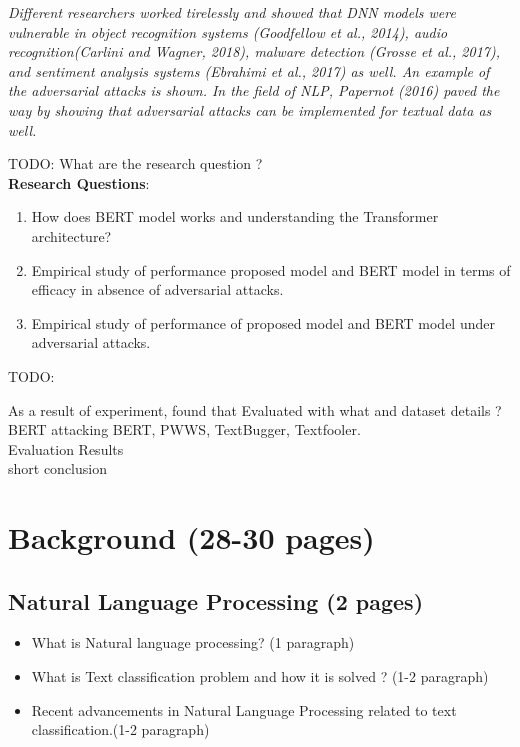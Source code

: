 \documentclass[%
	BCOR=8mm, %
	DIV=12, 
	toc=bibliography, %
	toc=listof, %
	oneside, %
	egregdoesnotlikesansseriftitles, %
	]{scrbook}
\begin{document}
\textit{ Different researchers worked tirelessly and showed that DNN models were vulnerable in object recognition systems (Goodfellow et al., 2014), audio recognition(Carlini and Wagner, 2018),
 malware detection (Grosse et al., 2017), and sentiment analysis systems (Ebrahimi et al., 2017) as well. An example of the adversarial attacks is shown.\cite{huq_adversarial_2020}
In the field of NLP, Papernot (2016) paved the way by showing that adversarial attacks can be implemented for textual data as well. \cite{huq_adversarial_2020}}

TODO:
What are the research question ? \\
\textbf{Research Questions}:
\begin{enumerate}
    \item How does BERT model works and understanding the Transformer architecture?
    \item Empirical study of performance proposed model and BERT model in terms of efficacy in absence of adversarial attacks.
    \item Empirical study of performance of proposed model and BERT model under adversarial attacks.
\end{enumerate}

 TODO: 
 
 As a result of experiment, found that 
 Evaluated with what and dataset details ?\\
 BERT attacking BERT, PWWS, TextBugger, Textfooler.\\
 Evaluation Results\\
 short conclusion\\
 
\chapter{Background (28-30 pages)}
\section{Natural Language Processing (2 pages)}

\begin{itemize}
\item What is Natural language processing? (1 paragraph)
\item What is Text classification problem and how it is solved ? (1-2 paragraph)
\item Recent advancements in Natural Language Processing related to text classification.(1-2 paragraph)
\end{itemize}
\end{document}

